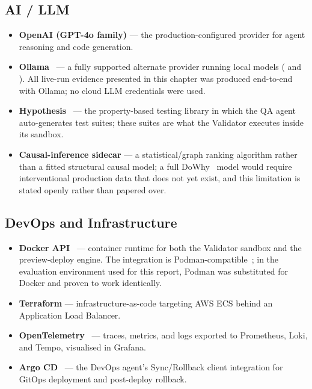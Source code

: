\subsection{AI / LLM}

\begin{itemize}[itemsep=2pt]
  \item \textbf{OpenAI (GPT-4o family)} --- the production-configured
        provider for agent reasoning and code generation.
  \item \textbf{Ollama}~\cite{ollama} --- a fully supported alternate
        provider running local models ( and
        ). All live-run evidence presented in this
        chapter was produced end-to-end with Ollama; no cloud LLM credentials
        were used.
  \item \textbf{Hypothesis}~\cite{hypothesis} --- the property-based testing
        library in which the QA agent auto-generates test suites; these
        suites are what the Validator executes inside its sandbox.
  \item \textbf{Causal-inference sidecar} --- a statistical/graph ranking
        algorithm rather than a fitted structural causal model; a full
        DoWhy~\cite{dowhy} model would require interventional production data
        that does not yet exist, and this limitation is stated openly rather
        than papered over.
\end{itemize}

\subsection{DevOps and Infrastructure}

\begin{itemize}[itemsep=2pt]
  \item \textbf{Docker API}~\cite{docker} --- container runtime for both the
        Validator sandbox and the preview-deploy engine. The integration is
        Podman-compatible~\cite{podman}; in the evaluation environment used
        for this report, Podman was substituted for Docker and proven to work
        identically.
  \item \textbf{Terraform} --- infrastructure-as-code targeting AWS ECS
        behind an Application Load Balancer.
  \item \textbf{OpenTelemetry}~\cite{otel} --- traces, metrics, and logs
        exported to Prometheus, Loki, and Tempo, visualised in Grafana.
  \item \textbf{Argo CD}~\cite{argocd} --- the DevOps agent's Sync/Rollback
        client integration for GitOps deployment and post-deploy rollback.
\end{itemize}

